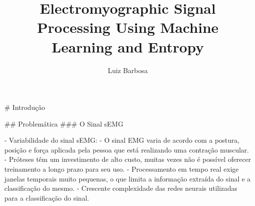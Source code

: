 \documentclass[unknownkeysallowed]{beamer}
\title[Processamento do EMG com ML e Entropia]{Electromyographic Signal Processing Using Machine Learning and Entropy}
\author{Luiz Barbosa}
\institute{Universidade de Brasília}
\begin{document}
\maketitle

\frame{\tableofcontents}

\begin{markdown}

# Introdução

%
%
%
%
%
%
%
%
%
%





## Problemática
### O Sinal sEMG

- Variabilidade do sinal sEMG:
    - O sinal EMG varia de acordo com a postura, posição e força aplicada pela pessoa que está realizando uma contração muscular.
    - Próteses têm um investimento de alto custo, muitas vezes não é possível oferecer treinamento a longo prazo para seu uso.
    - Processamento em tempo real exige janelas temporais muito pequenas, o que limita a informação extraída do sinal e a classificação do mesmo. 
    - Crescente complexidade das redes neurais utilizadas para a classificação do sinal.


\end{markdown}
\end{document}

